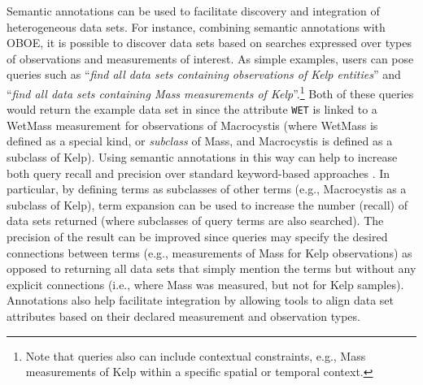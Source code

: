 Semantic annotations can be used to facilitate discovery and
integration of heterogeneous data sets. For instance, combining
semantic annotations with OBOE, it is possible to discover data sets
based on searches expressed over types of observations and
measurements of interest. As simple examples, users can pose queries
such as ``\emph{find all data sets containing observations of Kelp
  entities}'' and ``\emph{find all data sets containing Mass
  measurements of Kelp}''.\footnote{Note that queries also can include
  contextual constraints, e.g., Mass measurements of Kelp within a
  specific spatial or temporal context.} Both of these queries would
return the example data set in  since the
attribute {\tt WET} is linked to a WetMass measurement for observations
of Macrocystis (where WetMass is defined as a special kind, or
\emph{subclass} of Mass, and Macrocystis is defined as a subclass of
Kelp). Using semantic annotations in this way can help to increase
both query recall and precision over standard keyword-based approaches
\cite{berkley09:_improv_data_discov_for_metad}. In particular, by
defining terms as subclasses of other terms (e.g., Macrocystis as a
subclass of Kelp), term expansion can be used to increase the number
(recall) of data sets returned (where subclasses of query terms are
also searched). The precision of the result can be improved since
queries may specify the desired connections between terms (e.g.,
measurements of Mass for Kelp observations) as opposed to returning
all data sets that simply mention the terms but without any explicit
connections (i.e., where Mass was measured, but not for Kelp samples).
Annotations also help facilitate integration by allowing tools to
align data set attributes based on their declared measurement and
observation types.


